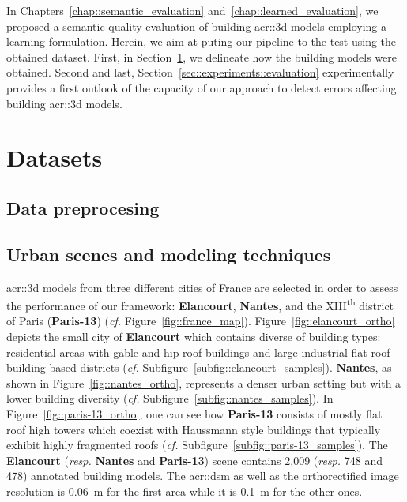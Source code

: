 \minitoc

\vfill

In Chapters~\ref{chap::semantic_evaluation} and~\ref{chap::learned_evaluation}, we proposed a semantic quality evaluation of building \gls{acr::3d} models employing a learning formulation.
Herein, we aim at puting our pipeline to the test using the obtained dataset.
First, in Section~\ref{sec::experiments::datasets}, we delineate how the building models were obtained.
Second and last, Section~\ref{sec::experiments::evaluation} experimentally provides a first outlook of the capacity of our approach to detect errors affecting building \gls{acr::3d} models.

\clearpage

\section{Datasets}
    \label{sec::experiments::datasets}
    
    \subsection{Data preprocesing}
        \label{subsec::experiments::datasets::preprocessing}

    \subsection{Urban scenes and modeling techniques}
        \label{subsec::experiments::datasets::scenes}        
        \gls{acr::3d} models from three different cities of France are selected in order to assess the performance of our framework: \textbf{Elancourt}, \textbf{Nantes}, and the XIII\textsuperscript{th} district of Paris (\textbf{Paris-13}) (\textit{cf.} Figure~\ref{fig::france_map}).
        Figure~\ref{fig::elancourt_ortho} depicts the small city of \textbf{Elancourt} which contains diverse of building types: residential areas with gable and hip roof buildings and large industrial flat roof building based districts (\textit{cf.} Subfigure~\ref{subfig::elancourt_samples}).
        \textbf{Nantes}, as shown in Figure~\ref{fig::nantes_ortho}, represents a denser urban setting but with a lower building diversity (\textit{cf.} Subfigure~\ref{subfig::nantes_samples}).
        In Figure~\ref{fig::paris-13_ortho}, one can see how \textbf{Paris-13} consists of mostly flat roof high towers which coexist with Haussmann style buildings that typically exhibit highly fragmented roofs (\textit{cf.} Subfigure~\ref{subfig::paris-13_samples}).
        The \textbf{Elancourt} (\textit{resp.} \textbf{Nantes} and \textbf{Paris-13}) scene contains 2,009 (\textit{resp.} 748 and 478) annotated building models.
        The \gls{acr::dsm} as well as the orthorectified image resolution is \SI{0.06}{\m} for the first area while it is \SI{0.1}{\m} for the other ones.\\


